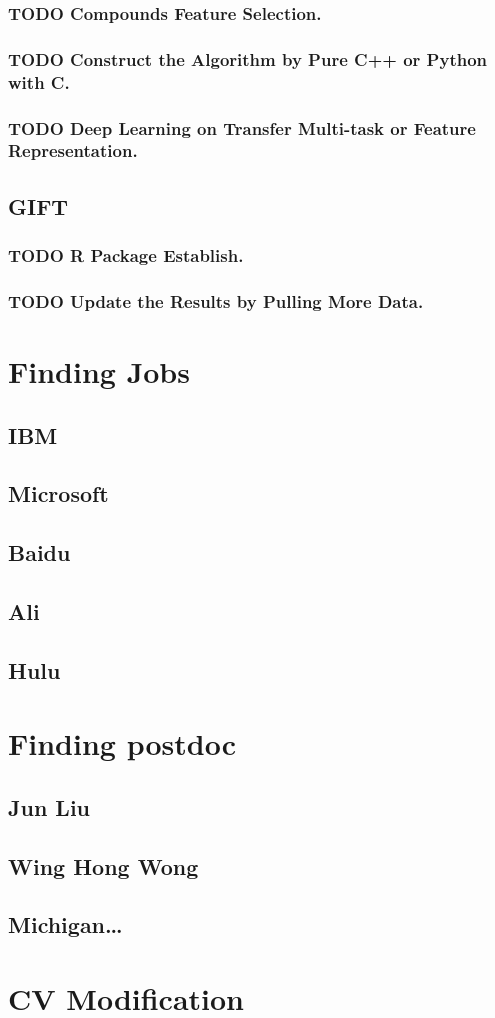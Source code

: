 \documentclass[11pt]{article}
\begin{document}
\subsubsection{\textbf{TODO} Compounds Feature Selection.}
\label{sec-3-3-1}
\subsubsection{\textbf{TODO} Construct the Algorithm by Pure C++ or Python with C.}
\label{sec-3-3-2}
\subsubsection{\textbf{TODO} Deep Learning on Transfer Multi-task or Feature Representation.}
\label{sec-3-3-3}
\subsection{GIFT}
\label{sec-3-4}
\subsubsection{\textbf{TODO} R Package Establish.}
\label{sec-3-4-1}
\subsubsection{\textbf{TODO} Update the Results by Pulling More Data.}
\label{sec-3-4-2}
\section{Finding Jobs}
\label{sec-4}
\subsection{IBM}
\label{sec-4-1}
\subsection{Microsoft}
\label{sec-4-2}
\subsection{Baidu}
\label{sec-4-3}
\subsection{Ali}
\label{sec-4-4}
\subsection{Hulu}
\label{sec-4-5}
\section{Finding postdoc}
\label{sec-5}
\subsection{Jun Liu}
\label{sec-5-1}
\subsection{Wing Hong Wong}
\label{sec-5-2}
\subsection{Michigan\ldots{}}
\label{sec-5-3}
\section{CV Modification}
\label{sec-6}
\end{document}
